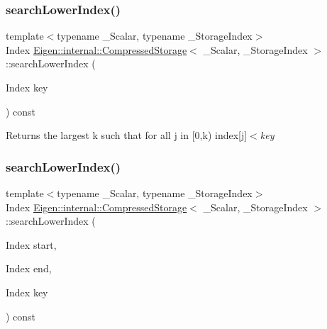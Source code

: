 \subsubsection{\texorpdfstring{searchLowerIndex()}{searchLowerIndex()}\hspace{0.1cm}{\footnotesize\ttfamily [1/2]}}
{\footnotesize\ttfamily template$<$typename \+\_\+\+Scalar, typename \+\_\+\+Storage\+Index$>$ \\
Index \mbox{\hyperlink{class_eigen_1_1internal_1_1_compressed_storage}{Eigen\+::internal\+::\+Compressed\+Storage}}$<$ \+\_\+\+Scalar, \+\_\+\+Storage\+Index $>$\+::search\+Lower\+Index (\begin{DoxyParamCaption}\item[{Index}]{key }\end{DoxyParamCaption}) const\hspace{0.3cm}{\ttfamily [inline]}}

\begin{DoxyReturn}{Returns}
the largest {\ttfamily k} such that for all {\ttfamily j} in \mbox{[}0,k) index\mbox{[}{\ttfamily j}\mbox{]}$<${\itshape key} 
\end{DoxyReturn}
\mbox{\label{class_eigen_1_1internal_1_1_compressed_storage_a250b3282557fc6da7cf505f93ab5ad59}} 
\subsubsection{\texorpdfstring{searchLowerIndex()}{searchLowerIndex()}\hspace{0.1cm}{\footnotesize\ttfamily [2/2]}}
{\footnotesize\ttfamily template$<$typename \+\_\+\+Scalar, typename \+\_\+\+Storage\+Index$>$ \\
Index \mbox{\hyperlink{class_eigen_1_1internal_1_1_compressed_storage}{Eigen\+::internal\+::\+Compressed\+Storage}}$<$ \+\_\+\+Scalar, \+\_\+\+Storage\+Index $>$\+::search\+Lower\+Index (\begin{DoxyParamCaption}\item[{Index}]{start,  }\item[{Index}]{end,  }\item[{Index}]{key }\end{DoxyParamCaption}) const\hspace{0.3cm}{\ttfamily [inline]}}

